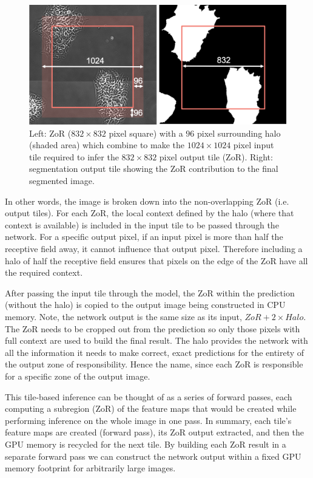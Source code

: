 \documentclass[10pt, indentfirst]{article}
\begin{document}
\begin{figure}
	\centering
	\includegraphics[width=\linewidth]{figs/zor.png}
	\caption{Left: ZoR ($832 \times 832$ pixel square) with a $96$ pixel surrounding halo (shaded area) which combine to make the $1024 \times 1024$ pixel input tile required to infer the $832 \times 832$ pixel output tile (ZoR).
		Right: segmentation output tile showing the ZoR contribution to the final segmented image.}
	\label{fig:zor}
\end{figure}

In other words, the image is broken down into the non-overlapping ZoR (i.e. output tiles).
For each ZoR, the local context defined by the halo (where that context is available) is included in the input tile to be passed through the network.
For a specific output pixel, if an input pixel is more than half the receptive field away, it cannot influence that output pixel.
Therefore including a halo of half the receptive field ensures that pixels on the edge of the ZoR have all the required context.

After passing the input tile through the model, the ZoR within the prediction (without the halo) is copied to the output image being constructed in CPU memory.
Note, the network output is the same size as its input, $ZoR + 2 \times Halo$.
The ZoR needs to be cropped out from the prediction so only those pixels with full context are used to build the final result.
The halo provides the network with all the information it needs to make correct, exact predictions for the entirety of the output zone of responsibility.
Hence the name, since each ZoR is responsible for a specific zone of the output image.

This tile-based inference can be thought of as a series of forward passes, each computing a subregion (ZoR) of the feature maps that would be created while performing inference on the whole image in one pass.
In summary, each tile's feature maps are created (forward pass), its ZoR output extracted, and then the GPU memory is recycled for the next tile.
By building each ZoR result in a separate forward pass we can construct the network output within a fixed GPU memory footprint for arbitrarily large images.
\end{document}
